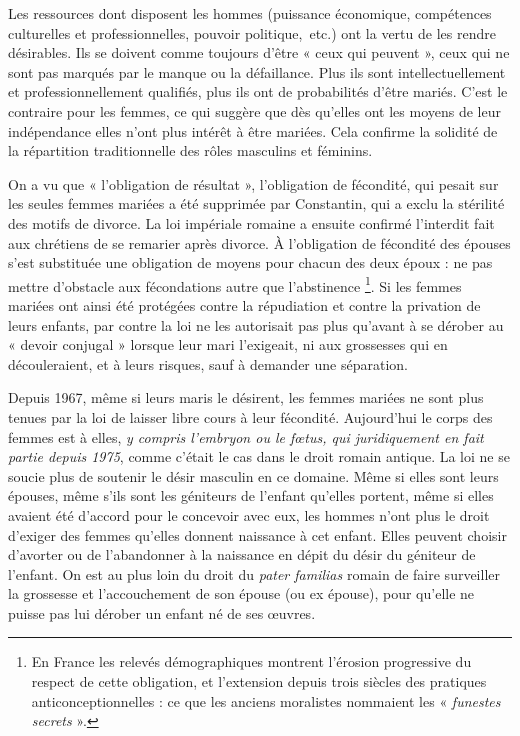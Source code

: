  Les ressources dont disposent les hommes (puissance économique, compétences culturelles et professionnelles, pouvoir politique,~etc.) ont la vertu de les rendre désirables. Ils se doivent comme toujours d'être « ceux qui peuvent », ceux qui ne sont pas marqués par le manque ou la défaillance. Plus ils sont intellectuellement et professionnellement qualifiés, plus ils ont de probabilités d'être mariés. C'est le contraire pour les femmes, ce qui suggère que dès qu'elles ont les moyens de leur indépendance elles n'ont plus intérêt à être mariées. Cela confirme la solidité de la répartition traditionnelle des rôles masculins et féminins.
 
 On a vu que « l'obligation de résultat », l'obligation de fécondité, qui pesait sur les seules femmes mariées a été supprimée par Constantin, qui a exclu la stérilité des motifs de divorce. La loi impériale romaine a ensuite confirmé l'interdit fait aux chrétiens de se remarier après divorce. À l'obligation de fécondité des épouses s'est substituée une obligation de moyens pour chacun des deux époux : ne pas mettre d'obstacle aux fécondations autre que l'abstinence 
\footnote{En France les relevés démographiques montrent l'érosion progressive du respect de cette obligation, et l'extension depuis trois siècles des pratiques anticonceptionnelles : ce que les anciens moralistes nommaient les « \emph{funestes secrets} ».}. Si les femmes mariées ont ainsi été protégées contre la répudiation et contre la privation de leurs enfants, par contre la loi ne les autorisait pas plus qu'avant à se dérober au « devoir conjugal » lorsque leur mari l'exigeait, ni aux grossesses qui en découleraient, et à leurs risques, sauf à demander une séparation. 

 Depuis 1967, même si leurs maris le désirent, les femmes mariées ne sont plus tenues par la loi de laisser libre cours à leur fécondité. Aujourd'hui le corps des femmes est à elles, \emph{y compris l'embryon ou le fœtus, qui juridiquement en fait partie depuis 1975}, comme c'était le cas dans le droit romain antique. La loi ne se soucie plus de soutenir le désir masculin en ce domaine. Même si elles sont leurs épouses, même s'ils sont les géniteurs de l'enfant qu'elles portent, même si elles avaient été d'accord pour le concevoir avec eux, les hommes n'ont plus le droit d'exiger des femmes qu'elles donnent naissance à cet enfant. Elles peuvent choisir d'avorter ou de l'abandonner à la naissance en dépit du désir du géniteur de l'enfant. On est au plus loin du droit du \emph{pater familias} romain de faire surveiller la grossesse et l'accouchement de son épouse (ou ex épouse), pour qu'elle ne puisse pas lui dérober un enfant né de ses œuvres.

